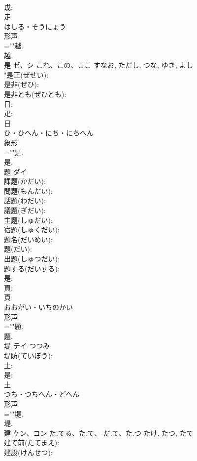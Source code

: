 \documentclass[8pt]{extreport}
\begin{document}
\begin{CJK}{UTF8}{min}
\\	戉: 
\\	走	
\\	はしる・そうにょう	
\\	形声 
\\	=""越.
\\	越.
\\	是	ゼ、シ	これ、この、ここ	すなお, ただし, つな, ゆき, よし	
\\	"是正(ぜせい): 
\\	是非(ぜひ): 
\\	是非とも(ぜひとも): 
\\	日: 
\\	疋: 
\\	日	
\\	ひ・ひへん・にち・にちへん	
\\	象形 
\\	=""是.
\\	是.
\\	題	ダイ			
\\	課題(かだい): 
\\	問題(もんだい): 
\\	話題(わだい): 
\\	議題(ぎだい): 
\\	主題(しゅだい): 
\\	宿題(しゅくだい): 
\\	題名(だいめい): 
\\	題(だい): 
\\	出題(しゅつだい): 
\\	題する(だいする): 
\\	是: 
\\	頁: 
\\	頁	
\\	おおがい・いちのかい	
\\	形声 
\\	=""題.
\\	題.
\\	堤	テイ	つつみ		
\\	堤防(ていぼう): 
\\	土: 
\\	是: 
\\	土	
\\	つち・つちへん・どへん	
\\	形声 
\\	=""堤.
\\	堤.
\\	建	ケン、コン	た.てる、た.て、-だ.て、た.つ	たけ, たつ, たて	
\\	建て前(たてまえ): 
\\	建設(けんせつ): 

\end{CJK}
\end{document}
